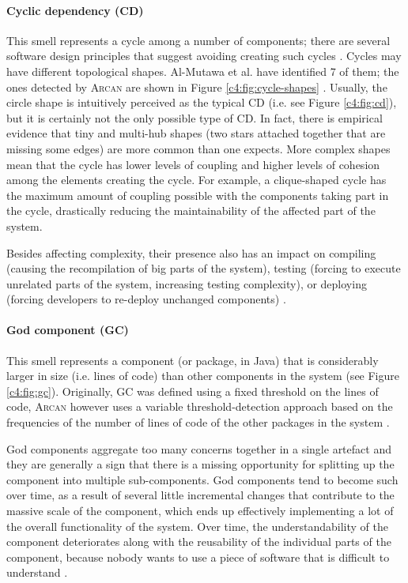 \paragraph{Cyclic dependency (CD)}\label{c4:sec:arch-smells-cd}
This smell represents a cycle among a number of components; there are several software design principles that suggest avoiding creating such cycles \cite{Lippert2006,Parnas1979,Stevens1974,Martin2018}.
Cycles may have different topological shapes. Al-Mutawa et al. \cite{AlMutawa2014} have identified 7 of them; the ones detected by \textsc{Arcan} are shown in Figure \ref{c4:fig:cycle-shapes} \cite{Arcelli2017}.
Usually, the circle shape is intuitively perceived as the typical CD (i.e. see Figure \ref{c4:fig:cd}), but it is certainly not the only possible type of CD. In fact, there is empirical evidence \cite{AlMutawa2014} that tiny and multi-hub shapes (two stars attached together that are missing some edges) are more common than one expects.
More complex shapes mean that the cycle has lower levels of coupling and higher levels of cohesion among the elements creating the cycle.
For example, a clique-shaped cycle has the maximum amount of coupling possible with the components taking part in the cycle, drastically reducing the maintainability of the affected part of the system.

Besides affecting complexity, their presence also has an impact on compiling (causing the recompilation of big parts of the system), testing (forcing to execute unrelated parts of the system, increasing testing complexity), or deploying (forcing developers to re-deploy unchanged components) \cite{Lippert2006}.

\paragraph{God component (GC)}\label{c4:sec:arch-smells-gc}
This smell represents a component (or package, in Java) that is considerably larger in size (i.e. lines of code) than other components in the system \cite{Lippert2006} (see Figure \ref{c4:fig:gc}).
Originally, GC was defined using a fixed threshold on the lines of code, \textsc{Arcan} however uses a variable threshold-detection approach based on the frequencies of the number of lines of code of the other packages in the system \cite{Arcelli2015}.

God components aggregate too many concerns together in a single artefact and they are generally a sign that there is a missing opportunity for splitting up the component into multiple sub-components.
God components tend to become such over time, as a result of several little incremental changes that contribute to the massive scale of the component, which ends up effectively implementing a lot of the overall functionality of the system.
Over time, the understandability of the component deteriorates along with the reusability of the individual parts of the component, because nobody wants to use a piece of software that is difficult to understand \cite{Lippert2006}.

